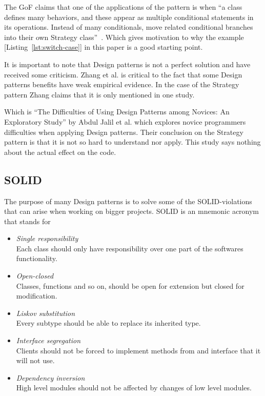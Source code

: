 \documentclass[conference, a4paper]{IEEEtran}
\begin{document}
The GoF claims that one of the applications of the pattern is when ``a class defines many behaviors, and these appear as multiple conditional statements in its operations. Instead of many conditionals, move related conditional branches into their own Strategy class''~\cite{bibitem:GoF}. Which gives motivation to why the example [Listing~\ref{lst:switch-case}] in this paper is a good starting point.

It is important to note that Design patterns is not a perfect solution and have received some criticism. Zhang et al. is critical to the fact that some Design patterns benefits have weak empirical evidence. In the case of the Strategy pattern Zhang claims that it is only mentioned in one study.~\cite{bibitem:Zhang}

Which is ``The Difficulties of Using Design Patterns among Novices: An Exploratory Study'' by Abdul Jalil et al. which explores novice programmers difficulties when applying Design patterns. Their conclusion on the Strategy pattern is that it is not so hard to understand nor apply. This study says nothing about the actual effect on the code.~\cite{bibitem:Jalil}

\subsection{SOLID}
The purpose of many Design patterns is to solve some of the SOLID-violations that can arise when working on bigger projects. SOLID is an mnemonic acronym that stands for
\begin{itemize}
    \item \emph{Single responsibility} \\
    Each class should only have responsibility over one part of the softwares functionality.
    \item \emph{Open-closed} \\
    Classes, functions and so on, should be open for extension but closed for modification.
    \item \emph{Liskov substitution} \\
    Every subtype should be able to replace its inherited type.
    \item \emph{Interface segregation} \\
    Clients should not be forced to implement methods from and interface that it will not use.
    \item \emph{Dependency inversion} \\
    High level modules should not be affected by changes of low level modules.
\end{itemize}
\end{document}
